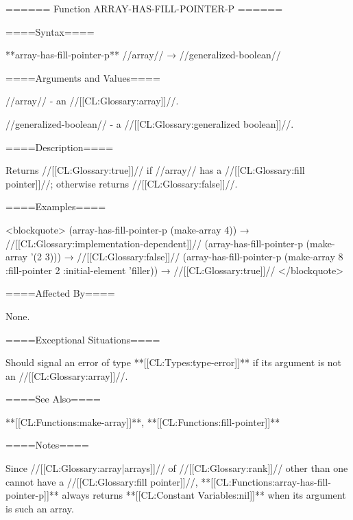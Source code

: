 ====== Function ARRAY-HAS-FILL-POINTER-P ======

====Syntax====

**array-has-fill-pointer-p** //array// → //generalized-boolean//

====Arguments and Values====

//array// - an //[[CL:Glossary:array]]//.

//generalized-boolean// - a //[[CL:Glossary:generalized boolean]]//.

====Description====

Returns //[[CL:Glossary:true]]// if //array// has a //[[CL:Glossary:fill pointer]]//; otherwise returns //[[CL:Glossary:false]]//.

====Examples====

<blockquote> (array-has-fill-pointer-p (make-array 4)) → //[[CL:Glossary:implementation-dependent]]// (array-has-fill-pointer-p (make-array '(2 3))) → //[[CL:Glossary:false]]// (array-has-fill-pointer-p (make-array 8 :fill-pointer 2 :initial-element 'filler)) → //[[CL:Glossary:true]]// </blockquote>

====Affected By====

None.

====Exceptional Situations====

Should signal an error of type **[[CL:Types:type-error]]** if its argument is not an //[[CL:Glossary:array]]//.

====See Also====

**[[CL:Functions:make-array]]**, **[[CL:Functions:fill-pointer]]**

====Notes====

Since //[[CL:Glossary:array|arrays]]// of //[[CL:Glossary:rank]]// other than one cannot have a //[[CL:Glossary:fill pointer]]//, **[[CL:Functions:array-has-fill-pointer-p]]** always returns **[[CL:Constant Variables:nil]]** when its argument is such an array.

